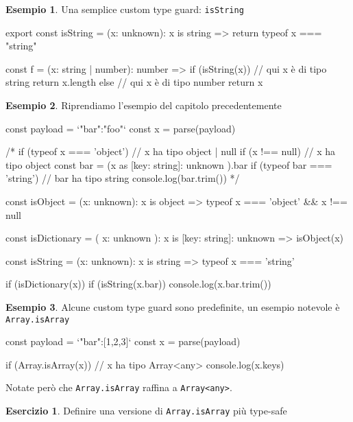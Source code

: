 \documentclass[12pt]{article}
\theoremstyle{definition}
\newtheorem{example}{Esempio}[subsection]
\newtheorem{exercise}{Esercizio}[subsection]
\newenvironment{code}
  {\vspace{0.5cm} \VerbatimEnvironment\begin{typescriptcode}}
  {\end{typescriptcode} \vspace{0.2cm}}
\begin{document}
\begin{example}
Una semplice custom type guard: \texttt{isString}

\begin{code}
export const isString = (x: unknown): x is string => {
  return typeof x === "string"
}

const f = (x: string | number): number => {
  if (isString(x)) {
    // qui x è di tipo string
    return x.length
  } else {
    // qui x è di tipo number
    return x
  }
}
\end{code}
\end{example}

\begin{example}
Riprendiamo l'esempio del capitolo precedentemente

\begin{code}
const payload = `{"bar":"foo"}`
const x = parse(payload)

/*
if (typeof x === 'object') {
  // x ha tipo object | null
  if (x !== null) {
    // x ha tipo object
    const bar = (x as { [key: string]: unknown }).bar
    if (typeof bar === 'string') {
      // bar ha tipo string
      console.log(bar.trim())
    }
  }
}
*/

const isObject = (x: unknown): x is object =>
  typeof x === 'object' && x !== null

const isDictionary = (
  x: unknown
): x is { [key: string]: unknown } => isObject(x)

const isString = (x: unknown): x is string =>
  typeof x === 'string'

if (isDictionary(x)) {
  if (isString(x.bar)) {
    console.log(x.bar.trim())
  }
}
\end{code}
\end{example}

\begin{example}
Alcune custom type guard sono predefinite, un esempio notevole è \texttt{Array.isArray}

\begin{code}
const payload = `{"bar":[1,2,3]}`
const x = parse(payload)

if (Array.isArray(x)) {
  // x ha tipo Array<any>
  console.log(x.keys)
}
\end{code}
\end{example}

Notate però che \texttt{Array.isArray} raffina a \texttt{Array<any>}.

\begin{exercise}
Definire una versione di \texttt{Array.isArray} più type-safe
\end{exercise}
\end{document}
